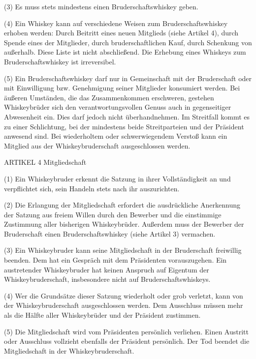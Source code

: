 (3) Es muss stets mindestens einen Bruderschaftswhiskey geben.

(4) Ein Whiskey kann auf verschiedene Weisen zum Bruderschaftswhiskey erhoben werden: Durch Beitritt eines neuen Mitglieds (siehe Artikel 4), durch Spende eines der Mitglieder, durch bruderschaftlichen Kauf, durch Schenkung von außerhalb. Diese Liste ist nicht abschließend. Die Erhebung eines Whiskeys zum Bruderschaftswhiskey ist irreversibel.

(5) Ein Bruderschaftswhiskey darf nur in Gemeinschaft mit der Bruderschaft oder mit Einwilligung bzw. Genehmigung seiner Mitglieder konsumiert werden. Bei äußeren Umständen, die das Zusammenkommen erschweren, gestehen Whiskeybrüder sich den verantwortungsvollen Genuss auch in gegenseitiger Abwesenheit ein. Dies darf jedoch nicht überhandnehmen. Im Streitfall kommt es zu einer Schlichtung, bei der mindestens beide Streitparteien und der Präsident anwesend sind. Bei wiederholtem oder schwerwiegendem Verstoß kann ein Mitglied aus der Whiskeybruderschaft ausgeschlossen werden.



    ARTIKEL 4
    Mitgliedschaft

(1) Ein Whiskeybruder erkennt die  Satzung in ihrer Vollständigkeit an und verpflichtet sich, sein Handeln stets nach ihr auszurichten.

(2) Die Erlangung der Mitgliedschaft erfordert die ausdrückliche Anerkennung der Satzung aus freiem Willen durch den Bewerber und die einstimmige Zustimmung aller bisherigen Whiskeybrüder. Außerdem muss der Bewerber der Bruderschaft einen Bruderschaftswhiskey (siehe Artikel 3) vermachen.

(3) Ein Whiskeybruder kann seine Mitgliedschaft in der Bruderschaft freiwillig beenden. Dem hat ein Gespräch mit dem Präsidenten vorauszugehen. Ein austretender Whiskeybruder hat keinen Anspruch auf Eigentum der Whiskeybruderschaft, insbesondere nicht auf Bruderschaftswhiskeys.

(4) Wer die Grundsätze dieser Satzung wiederholt oder grob verletzt, kann von der Whiskeybruderschaft ausgeschlossen werden. Dem Ausschluss müssen mehr als die Hälfte aller Whiskeybrüder und der Präsident zustimmen.

(5) Die Mitgliedschaft wird vom Präsidenten persönlich verliehen. Einen Austritt oder Ausschluss vollzieht ebenfalls der Präsident persönlich. Der Tod beendet die Mitgliedschaft in der Whiskeybruderschaft.


